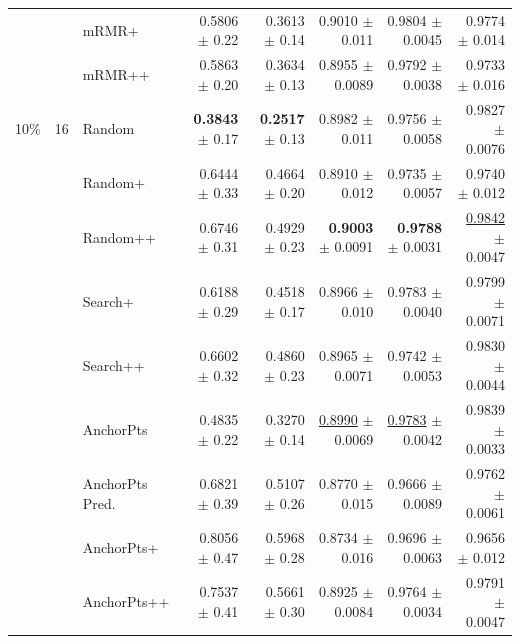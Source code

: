\begin{longtable}{llp{}rrrrr}
 &  & mRMR+ & 0.5806 {\scriptsize $\pm$ 0.22} & 0.3613 {\scriptsize $\pm$ 0.14} & 0.9010 {\scriptsize $\pm$ 0.011} & 0.9804 {\scriptsize $\pm$ 0.0045} & 0.9774 {\scriptsize $\pm$ 0.014} \\
 &  & mRMR++ & 0.5863 {\scriptsize $\pm$ 0.20} & 0.3634 {\scriptsize $\pm$ 0.13} & 0.8955 {\scriptsize $\pm$ 0.0089} & 0.9792 {\scriptsize $\pm$ 0.0038} & 0.9733 {\scriptsize $\pm$ 0.016} \\
\midrule
10\% & 16 & Random & \textbf{0.3843} {\scriptsize $\pm$ 0.17} & \textbf{0.2517} {\scriptsize $\pm$ 0.13} & 0.8982 {\scriptsize $\pm$ 0.011} & 0.9756 {\scriptsize $\pm$ 0.0058} & 0.9827 {\scriptsize $\pm$ 0.0076} \\
 &  & Random+ & 0.6444 {\scriptsize $\pm$ 0.33} & 0.4664 {\scriptsize $\pm$ 0.20} & 0.8910 {\scriptsize $\pm$ 0.012} & 0.9735 {\scriptsize $\pm$ 0.0057} & 0.9740 {\scriptsize $\pm$ 0.012} \\
 &  & Random++ & 0.6746 {\scriptsize $\pm$ 0.31} & 0.4929 {\scriptsize $\pm$ 0.23} & \textbf{0.9003} {\scriptsize $\pm$ 0.0091} & \textbf{0.9788} {\scriptsize $\pm$ 0.0031} & \underline{0.9842} {\scriptsize $\pm$ 0.0047} \\
 &  & Search+ & 0.6188 {\scriptsize $\pm$ 0.29} & 0.4518 {\scriptsize $\pm$ 0.17} & 0.8966 {\scriptsize $\pm$ 0.010} & 0.9783 {\scriptsize $\pm$ 0.0040} & 0.9799 {\scriptsize $\pm$ 0.0071} \\
 &  & Search++ & 0.6602 {\scriptsize $\pm$ 0.32} & 0.4860 {\scriptsize $\pm$ 0.23} & 0.8965 {\scriptsize $\pm$ 0.0071} & 0.9742 {\scriptsize $\pm$ 0.0053} & 0.9830 {\scriptsize $\pm$ 0.0044} \\
 &  & AnchorPts & 0.4835 {\scriptsize $\pm$ 0.22} & 0.3270 {\scriptsize $\pm$ 0.14} & \underline{0.8990} {\scriptsize $\pm$ 0.0069} & \underline{0.9783} {\scriptsize $\pm$ 0.0042} & 0.9839 {\scriptsize $\pm$ 0.0033} \\
 &  & AnchorPts Pred. & 0.6821 {\scriptsize $\pm$ 0.39} & 0.5107 {\scriptsize $\pm$ 0.26} & 0.8770 {\scriptsize $\pm$ 0.015} & 0.9666 {\scriptsize $\pm$ 0.0089} & 0.9762 {\scriptsize $\pm$ 0.0061} \\
 &  & AnchorPts+ & 0.8056 {\scriptsize $\pm$ 0.47} & 0.5968 {\scriptsize $\pm$ 0.28} & 0.8734 {\scriptsize $\pm$ 0.016} & 0.9696 {\scriptsize $\pm$ 0.0063} & 0.9656 {\scriptsize $\pm$ 0.012} \\
 &  & AnchorPts++ & 0.7537 {\scriptsize $\pm$ 0.41} & 0.5661 {\scriptsize $\pm$ 0.30} & 0.8925 {\scriptsize $\pm$ 0.0084} & 0.9764 {\scriptsize $\pm$ 0.0034} & 0.9791 {\scriptsize $\pm$ 0.0047} \\

\end{longtable}
